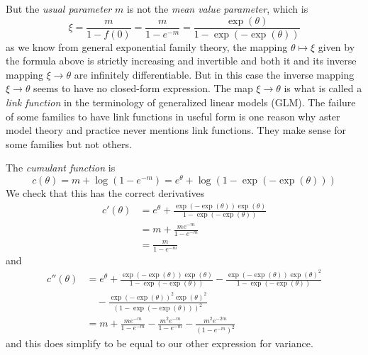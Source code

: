 But the \emph{usual parameter} $m$ is not the \emph{mean value parameter},
which is
\begin{equation} \label{eq:zero-truncated-poisson-theta-to-xi}
   \xi = \frac{m}{1 - f(0)} = \frac{m}{1 - e^{- m}}
   = \frac{\exp(\theta)}{1 - \exp(- \exp(\theta))}
\end{equation}
as we know from general exponential family theory,
the mapping $\theta \mapsto \xi$ given by the formula above is
strictly increasing and invertible and both it and its inverse mapping
$\xi \to \theta$ are infinitely differentiable.  But in this case
the inverse mapping $\xi \to \theta$ seems to have no closed-form expression.
The map $\xi \to \theta$ is what is called a \emph{link function} in the
terminology of generalized linear models (GLM).  The failure of some
families to have link functions in useful form is one reason why aster
model theory and practice never mentions link functions.  They make
sense for some families but not others.

The \emph{cumulant function} is
\begin{equation} \label{eq:zero-truncated-poisson-cumfun}
   c(\theta) = m + \log(1 - e^{- m})
   = e^\theta + \log(1 - \exp(- \exp(\theta)))
\end{equation}
We check that this has the correct derivatives
\begin{align*}
   c'(\theta)
   & =
   e^\theta 
   +
   \frac{\exp(- \exp(\theta)) \exp(\theta)}{1 - \exp(- \exp(\theta))}
   \\
   & =
   m + \frac{m e^{- m}}{1 - e^{- m}}
   \\
   & =
   \frac{m}{1 - e^{- m}}
\end{align*}
and
\begin{align*}
   c''(\theta)
   & =
   e^\theta 
   +
   \frac{\exp(- \exp(\theta)) \exp(\theta)}{1 - \exp(- \exp(\theta))}
   -
   \frac{\exp(- \exp(\theta)) \exp(\theta)^2}{1 - \exp(- \exp(\theta))}
   \\
   & \quad
   -
   \frac{\exp(- \exp(\theta))^2 \exp(\theta)^2}{(1 - \exp(- \exp(\theta)))^2}
   \\
   & =
   m + \frac{m e^{- m}}{1 - e^{- m}}
   - \frac{m^2 e^{- m}}{1 - e^{- m}}
   - \frac{m^2 e^{- 2 m}}{(1 - e^{- m})^2}
\end{align*}
and this does simplify to be equal to our other expression for variance.

